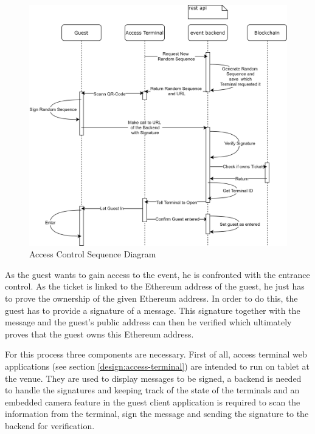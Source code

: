 \begin{figure}[H]
    \centering
    \includegraphics[width=16cm]{design/diagrams/AcessControl.png}
    \caption{Access Control Sequence Diagram}
    \label{fig:access-controll}
\end{figure}

As the guest wants to gain access to the event, he is confronted with the entrance control. As the ticket is linked to the Ethereum address of the guest, he just has to prove the ownership of the given Ethereum address. In order to do this, the guest has to provide a signature of a message. This signature together with the message and the guest's public address can then be verified which ultimately proves that the guest owns this Ethereum address.

For this process three components are necessary. First of all, access terminal web applications (see section \ref{design:access-terminal}) are intended to run on tablet at the venue. They are used to display messages to be signed, a backend is needed to handle the signatures and keeping track of the state of the terminals and an embedded camera feature in the guest client application is required to scan the information from the terminal, sign the message and sending the signature to the backend for verification.


